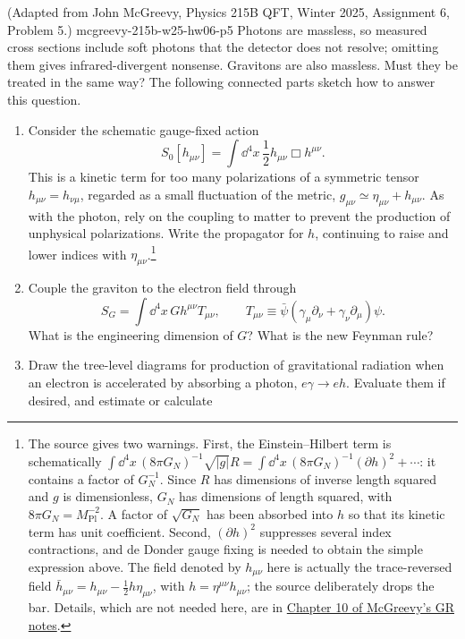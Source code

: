 \begin{enumerate}
  {(Adapted from John McGreevy, Physics 215B QFT, Winter 2025,
  Assignment 6, Problem 5.)}
  {mcgreevy-215b-w25-hw06-p5}
Photons are massless, so measured cross sections include soft photons that
the detector does not resolve; omitting them gives infrared-divergent
nonsense.  Gravitons are also massless.  Must they be treated in the same
way?  The following connected parts sketch how to answer this question.
\begin{enumerate}
\item
Consider the schematic gauge-fixed action
\[
 S_0[h_{\mu\nu}]=\int \dd^4x\,\frac12h_{\mu\nu}\Box h^{\mu\nu}.
\]
This is a kinetic term for too many polarizations of a symmetric tensor
\(h_{\mu\nu}=h_{\nu\mu}\), regarded as a small fluctuation of the metric,
\(g_{\mu\nu}\simeq\eta_{\mu\nu}+h_{\mu\nu}\).  As with the photon, rely
on the coupling to matter to prevent the production of unphysical
polarizations.  Write the propagator for \(h\), continuing to raise and
lower indices with \(\eta_{\mu\nu}\).\footnote{The source gives two
warnings.  First, the Einstein--Hilbert term is schematically
\(\int \dd^4x\,(8\pi G_N)^{-1}\sqrt{|g|}R
=\int \dd^4x\,(8\pi G_N)^{-1}(\partial h)^2+\cdots\): it contains a factor
of \(G_N^{-1}\).  Since \(R\) has dimensions of inverse length squared and
\(g\) is dimensionless, \(G_N\) has dimensions of length squared, with
\(8\pi G_N=M_{\mathrm{Pl}}^{-2}\).  A factor of \(\sqrt{G_N}\) has been
absorbed into \(h\) so that its kinetic term has unit coefficient.
Second, \((\partial h)^2\) suppresses several index contractions, and de
Donder gauge fixing is needed to obtain the simple expression above.  The
field denoted by \(h_{\mu\nu}\) here is actually the trace-reversed field
\(\bar h_{\mu\nu}=h_{\mu\nu}-\tfrac12h\eta_{\mu\nu}\), with
\(h=\eta^{\mu\nu}h_{\mu\nu}\); the source deliberately drops the bar.
Details, which are not needed here, are in
\href{https://mcgreevy.physics.ucsd.edu/f13/225A-lectures.pdf}{Chapter 10
of McGreevy's GR notes}.}
\item
Couple the graviton to the electron field through
\[
 S_G=\int \dd^4x\,G h^{\mu\nu}T_{\mu\nu},
 \qquad
 T_{\mu\nu}\equiv
 \bar\psi(\gamma_\mu\partial_\nu+\gamma_\nu\partial_\mu)\psi.
\]
What is the engineering dimension of \(G\)?  What is the new Feynman rule?
\item
Draw the tree-level diagrams for production of gravitational radiation
when an electron is accelerated by absorbing a photon,
\(e\gamma\to eh\).  Evaluate them if desired, and estimate or calculate

\end{enumerate}
\end{enumerate}
